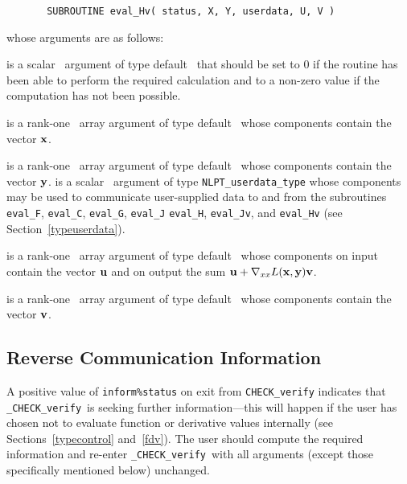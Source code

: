 \documentclass{galahad}
\newcommand{\packagename}{CHECK}
\newcommand{\fullpackagename}{\libraryname\_\packagename}
\newcommand{\solver}{{\tt \fullpackagename\_verify}}
\begin{document}
\def\baselinestretch{0.8}
{\tt \begin{verbatim}
       SUBROUTINE eval_Hv( status, X, Y, userdata, U, V ) \end{verbatim} }
\def\baselinestretch{1.0}
\noindent whose arguments are as follows:

\begin{description}
 is a scalar \intentout\ argument of type default \integer\
that should be set to 0 if the routine has been able to perform the
required calculation and to a non-zero value if the computation has not
been possible. 

 is a rank-one \intentin\ array argument of type default \realdp\
whose components contain the vector ${\mathbf{x}}$.

 is a rank-one \intentin\ array argument of type default \realdp\
whose components contain the vector ${\mathbf{y}}$.
 is a scalar \intentinout\ argument of type 
{\tt NLPT\_userdata\_type} whose components may be used
to communicate user-supplied data to and from the
subroutines {\tt eval\_F}, {\tt eval\_C}, {\tt eval\_G}, {\tt eval\_J}
{\tt eval\_H}, {\tt eval\_Jv}, and {\tt eval\_Hv} 
(see Section~\ref{typeuserdata}). 

\ittf{U} is a rank-one \intentinout\ array argument of type default \realdp\
whose components on input contain the vector ${\mathbf{u}}$ and on output the
sum ${\mathbf{u}} + \nabla_{xx} L({\mathbf{x}},{\mathbf{y}}) {\mathbf{v}}$.

\ittf{V} is a rank-one \intentin\ array argument of type default \realdp\
whose components contain the vector ${\mathbf{v}}$.


\end{description}


\subsection{\label{reverse}Reverse Communication Information}

A positive value of {\tt inform\%status} on exit from 
{\tt \packagename\_verify}
indicates that
\solver\ is seeking further information---this will happen 
if the user has chosen not to evaluate function or 
derivative values internally (see Sections~\ref{typecontrol} and~\ref{fdv}).
The user should compute the required information and re-enter \solver\
with all arguments (except those specifically mentioned below) unchanged.
\end{document}
